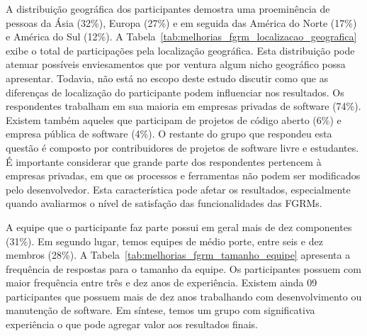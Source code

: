 A distribuição geográfica dos participantes demostra uma proeminência de
pessoas da Ásia (32\%), Europa (27\%) e em seguida das América do Norte (17\%)
e América do Sul (12\%). A
Tabela~\ref{tab:melhorias_fgrm_localizacao_geografica} exibe o total de
participações pela localização geográfica. Esta distribuição pode atenuar
possíveis enviesamentos que por ventura algum nicho geográfico possa
apresentar. Todavia, não está no escopo deste estudo discutir como que as
diferenças de localização do participante podem influenciar nos resultados. Os
respondentes trabalham em sua maioria em empresas privadas de software (74\%).
Existem também aqueles que participam de projetos de código aberto (6\%) e
empresa pública de software (4\%). O restante do grupo que respondeu esta
questão é composto por contribuidores de projetos de software livre e
estudantes. É importante considerar que grande parte dos respondentes pertencem
à empresas privadas, em que os processos e ferramentas não podem ser
modificados pelo desenvolvedor. Esta característica pode afetar os resultados,
especialmente quando avaliarmos o nível de satisfação das funcionalidades das
FGRMs.

\begin{table}[htpb]
\centering
{}
\caption{Localização Geográfica dos Participantes}\label{tab:melhorias_fgrm_localizacao_geografica}
\end{table}

A equipe que o participante faz parte possui em geral mais de dez componentes
(31\%). Em segundo lugar, temos equipes de médio porte, entre seis e dez
membros (28\%). A Tabela~\ref{tab:melhorias_fgrm_tamanho_equipe} apresenta a
frequência de respostas para o tamanho da equipe. Os participantes possuem com
maior frequência entre três e dez anos de experiência. Existem ainda 09
participantes que possuem mais de dez anos trabalhando com desenvolvimento ou
manutenção de software. Em síntese, temos um grupo com significativa
experiência o que pode agregar valor aos resultados finais.

